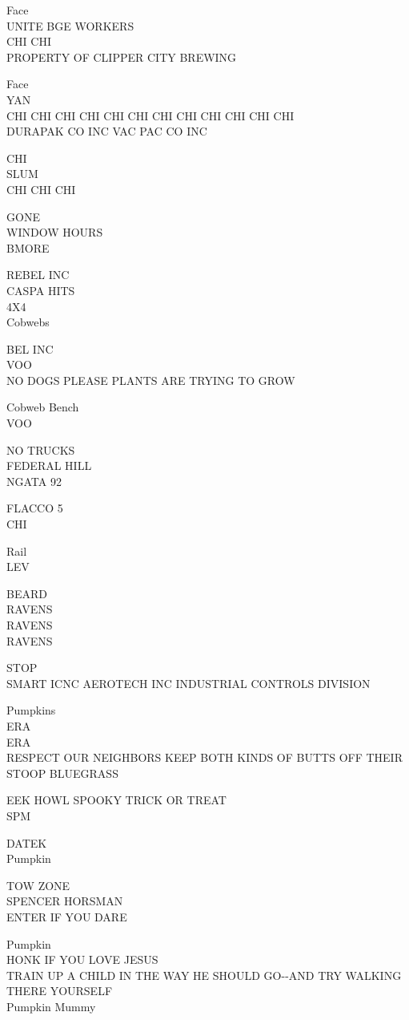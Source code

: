 \documentclass[10pt,letterpaper]{article}
\begin{document}
Face\\
UNITE BGE WORKERS\\
CHI CHI\\
PROPERTY OF CLIPPER CITY BREWING

Face\\
YAN\\
CHI CHI CHI CHI CHI CHI CHI CHI CHI CHI CHI CHI\\
DURAPAK CO INC VAC PAC CO INC

CHI\\
SLUM\\
CHI CHI CHI

GONE\\
WINDOW HOURS\\
BMORE

REBEL INC\\
CASPA HITS\\
4X4\\
Cobwebs

BEL INC\\
VOO\\
NO DOGS PLEASE PLANTS ARE TRYING TO GROW

Cobweb Bench\\
VOO

NO TRUCKS\\
FEDERAL HILL\\
NGATA 92

FLACCO 5\\
CHI

Rail\\
LEV

BEARD\\
RAVENS\\
RAVENS\\
RAVENS

STOP\\
SMART ICNC AEROTECH INC INDUSTRIAL CONTROLS DIVISION

Pumpkins\\
ERA\\
ERA\\
RESPECT OUR NEIGHBORS KEEP BOTH KINDS OF BUTTS OFF THEIR STOOP BLUEGRASS

EEK HOWL SPOOKY TRICK OR TREAT\\
SPM

DATEK\\
Pumpkin

TOW ZONE\\
SPENCER HORSMAN\\
ENTER IF YOU DARE

Pumpkin\\
HONK IF YOU LOVE JESUS\\
TRAIN UP A CHILD IN THE WAY HE SHOULD GO{-}{-}AND TRY WALKING THERE YOURSELF\\
Pumpkin Mummy
\end{document}
